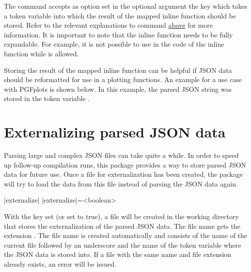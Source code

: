 \documentclass[a4paper]{article}
\begin{document}
{{The command \macro{\JSONParseArrayMapInline} accepts as option set in the optional argument the key  which takes a token variable into which the result of the mapped inline function should be stored. Refer to the relevant explanations to command \macro{\JSONParseArrayUse} \hyperlink{macro:arrayuse}{above} for more information. It is important to note that the inline function needs to be fully expandable. For example, it is not possible to use \macro{\JSONParseValue} in the code of the inline function while \macro{\JSONParseExpandableValue} is allowed.

Storing the result of the mapped inline function can be helpful if JSON data should be reformatted for use in a plotting functions. An example for a use case with PGFplots is shown below. In this example, the parsed JSON string  was stored in the token variable \macro{\myJSONplotdata}.

\pgfplotsset{width=5.25cm}

\begin{codeexamplecolumns}

\end{codeexamplecolumns}

\section{Externalizing parsed JSON data}\label{sec:externalizing}

Parsing large and complex JSON files can take quite a while. In order to speed up follow-up compilation runs, this package provides a way to store parsed JSON data for future use. Once a file for externalization has been created, the package will try to load the data from this file instead of parsing the JSON data again.

\begin{macrodef}
|externalize|
|externalize|={<boolean>}
\end{macrodef}
With the key  set (or set to true), a file will be created in the working directory that stores the externalization of the parsed JSON data. The file name gets the extension . The file name is created automatically and consists of the name of the current file followed by an underscore and the name of the token variable where the JSON data is stored into. If a file with the same name and file extension already exists, an error will be issued.

}}
\end{document}
